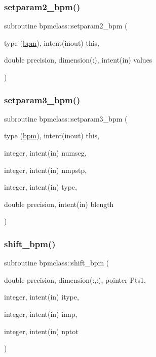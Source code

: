 \mbox{\label{namespacebpmclass_a37f4e426713e3624ee853c1343294cab}} 
\subsubsection{\texorpdfstring{setparam2\_bpm()}{setparam2\_bpm()}}
{\footnotesize\ttfamily subroutine bpmclass\+::setparam2\+\_\+bpm (\begin{DoxyParamCaption}\item[{type (\mbox{\hyperlink{namespacebpmclass_structbpmclass_1_1bpm}{bpm}}), intent(inout)}]{this,  }\item[{double precision, dimension(\+:), intent(in)}]{values }\end{DoxyParamCaption})}

\mbox{\label{namespacebpmclass_a75a67023bf7f429ccd2ef12a435077a7}} 
\subsubsection{\texorpdfstring{setparam3\_bpm()}{setparam3\_bpm()}}
{\footnotesize\ttfamily subroutine bpmclass\+::setparam3\+\_\+bpm (\begin{DoxyParamCaption}\item[{type (\mbox{\hyperlink{namespacebpmclass_structbpmclass_1_1bpm}{bpm}}), intent(inout)}]{this,  }\item[{integer, intent(in)}]{numseg,  }\item[{integer, intent(in)}]{nmpstp,  }\item[{integer, intent(in)}]{type,  }\item[{double precision, intent(in)}]{blength }\end{DoxyParamCaption})}

\mbox{\label{namespacebpmclass_af08cf75c879f797ae8f03ba69e95d628}} 
\subsubsection{\texorpdfstring{shift\_bpm()}{shift\_bpm()}}
{\footnotesize\ttfamily subroutine bpmclass\+::shift\+\_\+bpm (\begin{DoxyParamCaption}\item[{double precision, dimension(\+:,\+:), pointer}]{Pts1,  }\item[{integer, intent(in)}]{itype,  }\item[{integer, intent(in)}]{innp,  }\item[{integer, intent(in)}]{nptot }\end{DoxyParamCaption})}



